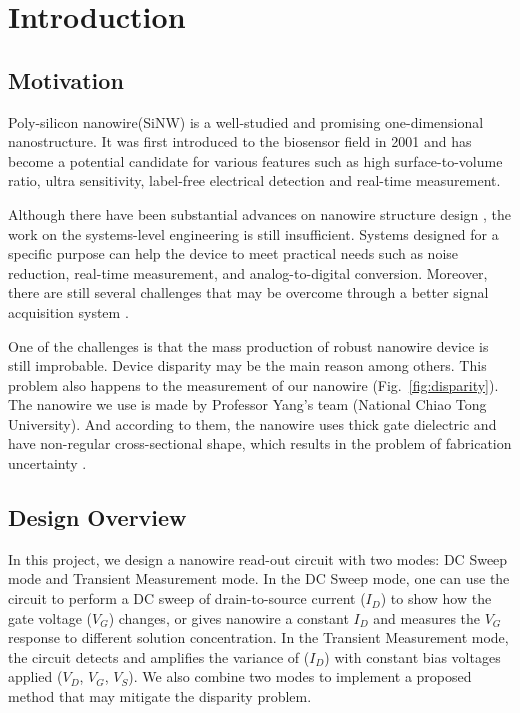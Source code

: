 \chapter{Introduction}
\section{Motivation}
Poly-silicon nanowire(SiNW) is a well-studied and promising one-dimensional nanostructure.
It was first introduced to the biosensor field in 2001\cite{C2001} and has become a potential candidate for various features such as high surface-to-volume ratio, ultra sensitivity, label-free electrical detection and real-time measurement.

Although there have been substantial advances on nanowire structure design \cite{R1}, the work on the systems-level engineering is still insufficient.
Systems designed for a specific purpose can help the device to meet practical needs such as noise reduction, real-time measurement, and analog-to-digital conversion.
Moreover, there are still several challenges that may be overcome through a better signal acquisition system \cite{R1}.

One of the challenges is that the mass production of robust nanowire device is still improbable.
Device disparity may be the main reason among others.
This problem also happens to the measurement of our nanowire (Fig.~\ref{fig:disparity}).
The nanowire we use is made by Professor Yang's team (National Chiao Tong University).
And according to them, the nanowire uses thick gate dielectric and have non-regular cross-sectional shape, which results in the problem of fabrication uncertainty \cite{C6}.


\section{Design Overview}
In this project, we design a nanowire read-out circuit with two modes: DC Sweep mode and Transient Measurement mode.
In the DC Sweep mode, one can use the circuit to perform a DC sweep of drain-to-source current ($I_D$) to show how the gate voltage ($V_G$) changes, or gives nanowire a constant $I_D$ and measures the $V_{G}$ response to different solution concentration.
In the Transient Measurement mode, the circuit detects and amplifies the variance of ($I_D$) with constant bias voltages applied ($V_D$, $V_G$, $V_S$).
We also combine two modes to implement a proposed method that may mitigate the disparity problem.

